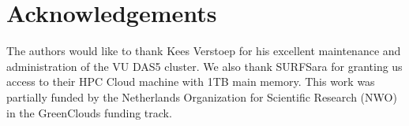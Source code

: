\section{Acknowledgements}

The authors would like to thank Kees Verstoep for his excellent maintenance
and administration of the VU DAS5 cluster. We also thank SURFSara for
granting us access to their HPC Cloud machine with 1TB main memory.
This work was partially funded by the Netherlands Organization for Scientific
Research (NWO) in the GreenClouds funding track.

